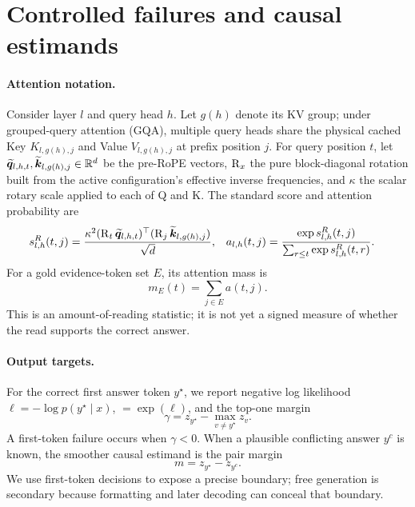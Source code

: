 \section{Controlled failures and causal estimands}
\label{sec:setup}

\paragraph{Attention notation.}
Consider layer $l$ and query head $h$.  Let $g(h)$ denote its KV group; under
grouped-query attention (GQA), multiple query heads share the physical cached
Key $K_{l,g(h),j}$ and Value $V_{l,g(h),j}$ at prefix position $j$.  For query
position $t$, let $\widetilde{\bm q}_{l,h,t},\widetilde{\bm k}_{l,g(h),j}\in\mathbb R^d$ be the
pre-RoPE vectors, $\operatorname{R}_x$ the pure block-diagonal rotation built from the
active configuration's effective inverse frequencies, and $\kappa$ the scalar
rotary scale applied to each of Q and K.  The standard score and attention
probability are
\begin{align}
  s^R_{l,h}(t,j)
  &=\frac{\kappa^2(\operatorname{R}_t\widetilde{\bm q}_{l,h,t})^\top
  (\operatorname{R}_j\widetilde{\bm k}_{l,g(h),j})}{\sqrt d},
  &
  a_{l,h}(t,j)
  &=\frac{\exp s^R_{l,h}(t,j)}
  {\sum_{r\le t}\exp s^R_{l,h}(t,r)}.
  \label{eq:standard-attn}
\end{align}
For a gold evidence-token set $E$, its attention mass is
\begin{equation}
  m_E(t)=\sum_{j\in E}a(t,j).
  \label{eq:evidence-mass}
\end{equation}
This is an amount-of-reading statistic; it is not yet a signed measure of
whether the read supports the correct answer.

\paragraph{Output targets.}
For the correct first answer token $y^\star$, we report negative log likelihood
$\ell=-\log p(y^\star\mid x)$, \GoldPPL $=\exp(\ell)$, and the top-one margin
\begin{equation}
  \gamma=z_{y^\star}-\max_{v\ne y^\star}z_v.
  \label{eq:margin}
\end{equation}
A first-token failure occurs when $\gamma<0$.  When a plausible conflicting
answer $y^c$ is known, the smoother causal estimand is the pair margin
\begin{equation}
  m=z_{y^\star}-z_{y^c}.
  \label{eq:pair-margin}
\end{equation}
We use first-token decisions to expose a precise boundary; free generation is
secondary because formatting and later decoding can conceal that boundary.

